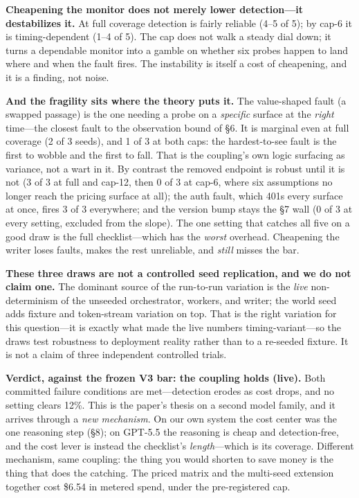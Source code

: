 \documentclass[acmsmall,screen]{acmart}
\begin{document}
\textbf{Cheapening the monitor does not merely lower detection---it destabilizes
it.} At full coverage detection is fairly reliable (4--5 of 5); by cap-6 it is
timing-dependent (1--4 of 5). The cap does not walk a steady dial down; it turns a
dependable monitor into a gamble on whether six probes happen to land where and
when the fault fires. The instability is itself a cost of cheapening, and it is a
finding, not noise.

\textbf{And the fragility sits where the theory puts it.} The value-shaped fault
(a swapped passage) is the one needing a probe on a \emph{specific} surface at the
\emph{right} time---the closest fault to the observation bound of \S6. It is
marginal even at full coverage (2 of 3 seeds), and 1 of 3 at both caps: the
hardest-to-see fault is the first to wobble and the first to fall. That is the
coupling's own logic surfacing as variance, not a wart in it. By contrast the
removed endpoint is robust until it is not (3 of 3 at full and cap-12, then 0 of 3
at cap-6, where six assumptions no longer reach the pricing surface at all); the
auth fault, which 401s every surface at once, fires 3 of 3 everywhere; and the
version bump stays the \S7 wall (0 of 3 at every setting, excluded from the
slope). The one setting that catches all five on a good draw is the full
checklist---which has the \emph{worst} overhead. Cheapening the writer loses
faults, makes the rest unreliable, and \emph{still} misses the bar.

\textbf{These three draws are not a controlled seed replication, and we do not
claim one.} The dominant source of the run-to-run variation is the \emph{live}
non-determinism of the unseeded orchestrator, workers, and writer; the world seed
adds fixture and token-stream variation on top. That is the right variation for
this question---it is exactly what made the live numbers timing-variant---so the
draws test robustness to deployment reality rather than to a re-seeded fixture. It
is not a claim of three independent controlled trials.

\textbf{Verdict, against the frozen V3 bar: the coupling holds (live).} Both
committed failure conditions are met---detection erodes as cost drops, and no
setting clears 12\%. This is the paper's thesis on a second model family, and it
arrives through a \emph{new mechanism}. On our own system the cost center was the
one reasoning step (\S8); on GPT-5.5 the reasoning is cheap and detection-free,
and the cost lever is instead the checklist's \emph{length}---which is its
coverage. Different mechanism, same coupling: the thing you would shorten to save
money is the thing that does the catching. The priced matrix and the multi-seed
extension together cost \$6.54 in metered spend, under the pre-registered cap.
\end{document}
